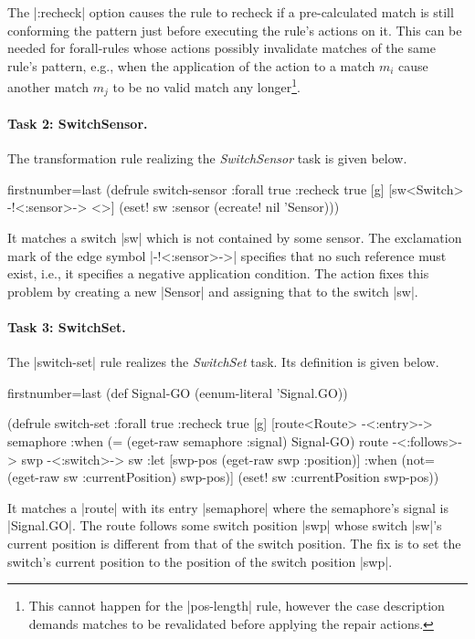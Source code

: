 \documentclass[submission]{eptcs}
\newcommand{\code}{\clojureinline}
\begin{document}
The \code|:recheck| option causes the rule to recheck if a pre-calculated match
is still conforming the pattern just before executing the rule's actions on it.
This can be needed for forall-rules whose actions possibly invalidate matches
of the same rule's pattern, e.g., when the application of the action to a match
\(m_i\)
cause another match \(m_j\)
to be no valid match any longer\footnote{This cannot happen for the
  \code|pos-length| rule, however the case description demands matches to be
  revalidated before applying the repair actions.}.


\paragraph{Task 2: SwitchSensor.}

The transformation rule realizing the \emph{SwitchSensor} task is given below.

\begin{clojurecode*}{firstnumber=last}
(defrule switch-sensor {:forall true :recheck true} [g]
  [sw<Switch> -!<:sensor>-> <>]
  (eset! sw :sensor (ecreate! nil 'Sensor)))
\end{clojurecode*}

It matches a switch \code|sw| which is not contained by some sensor.  The
exclamation mark of the edge symbol \code|-!<:sensor>->| specifies that no such
reference must exist, i.e., it specifies a negative application condition.  The
action fixes this problem by creating a new \code|Sensor| and assigning that to
the switch \code|sw|.


\paragraph{Task 3: SwitchSet.}

The \code|switch-set| rule realizes the \emph{SwitchSet} task.  Its definition
is given below.

\begin{clojurecode*}{firstnumber=last}
(def Signal-GO (eenum-literal 'Signal.GO))

(defrule switch-set {:forall true :recheck true} [g]
  [route<Route> -<:entry>-> semaphore
   :when (= (eget-raw semaphore :signal) Signal-GO)
   route -<:follows>-> swp -<:switch>-> sw
   :let [swp-pos (eget-raw swp :position)]
   :when (not= (eget-raw sw :currentPosition) swp-pos)]
  (eset! sw :currentPosition swp-pos))
\end{clojurecode*}

It matches a \code|route| with its entry \code|semaphore| where the semaphore's
signal is \code|Signal.GO|.  The route follows some switch position \code|swp|
whose switch \code|sw|'s current position is different from that of the switch
position.  The fix is to set the switch's current position to the position of
the switch position \code|swp|.
\end{document}
